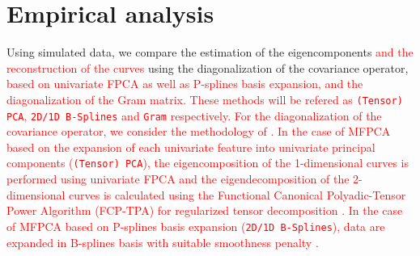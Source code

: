 \section{Empirical analysis} %
\label{sec:empirical_analysis}


Using simulated data, we compare the estimation of the eigencomponents \textcolor{red}{and the reconstruction of the curves} using the diagonalization of the covariance operator, \textcolor{red}{based on univariate FPCA as well as P-splines basis expansion, and the diagonalization of the Gram matrix. These methods will be refered as \texttt{(Tensor) PCA}, \texttt{2D/1D B-Splines} and \texttt{Gram} respectively. For the diagonalization of the covariance operator, we consider the methodology of \cite{happMultivariateFunctionalPrincipal2018a}. In the case of MFPCA based on the expansion of each univariate feature into univariate principal components (\texttt{(Tensor) PCA}), the eigencomposition of the 1-dimensional curves is performed using univariate FPCA and the eigendecomposition of the 2-dimensional curves is calculated using the Functional Canonical Polyadic-Tensor Power Algorithm (FCP-TPA) for regularized tensor decomposition \citep{allenMultiwayFunctionalPrincipal2013a}. In the case of MFPCA based on P-splines basis expansion (\texttt{2D/1D B-Splines}), data are expanded in B-splines basis with suitable smoothness penalty \citep{eilersFlexibleSmoothingBsplines1996}.}

